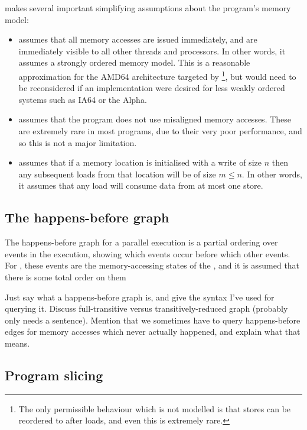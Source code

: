 {\Technique} makes several important simplifying assumptions about the
program's memory model:

\begin{itemize}
\item
  {\Technique} assumes that all memory accesses are issued
  immediately, and are immediately visible to all other threads and
  processors.  In other words, it assumes a strongly ordered memory
  model.  This is a reasonable approximation for the AMD64
  architecture targeted by {\implementation}\footnote{The only
    permissible behaviour which is not modelled is that stores can be
    reordered to after loads, and even this is extremely rare.}, but
  would need to be reconsidered if an implementation were desired for
  less weakly ordered systems such as IA64 or the Alpha.
\item
  {\Technique} assumes that the program does not use misaligned memory
  accesses.  These are extremely rare in most programs, due to their
  very poor performance, and so this is not a
  major limitation.
\item
  {\Implementation} assumes that if a memory location is initialised
  with a write of size $n$ then any subsequent loads from that
  location will be of size $m \le n$.  In other words, it assumes that
  any load will consume data from at most one store.  
\end{itemize}

\subsection{The happens-before graph}

The happens-before graph for a parallel execution is a partial
ordering over events in the execution, showing which events occur
before which other events\needCite{}.  For {\technique}, these events
are the memory-accessing states of the {\StateMachine}, and it is
assumed that there is some total order on them


Just say what a happens-before graph is, and give the syntax I've used
for querying it.  Discuss full-transitive versus transitively-reduced
graph (probably only needs a sentence).  Mention that we sometimes
have to query happens-before edges for memory accesses which never
actually happened, and explain what that means.

\subsection{Program slicing}

